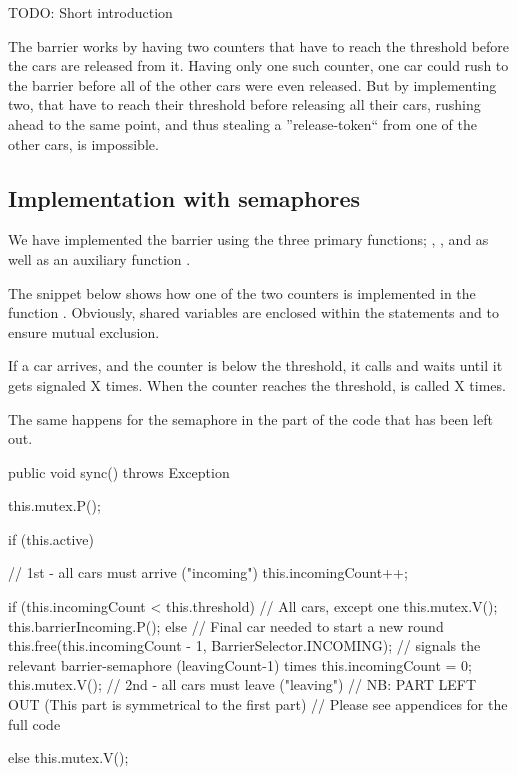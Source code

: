 
TODO: Short introduction

The barrier works by having two counters that have to reach the threshold before the cars are released from it. Having only one such counter, one car could rush to the barrier before all of the other cars were even released. But by implementing two, that have to reach their threshold before releasing all their cars, rushing ahead to the same point, and thus stealing a ''release-token`` from one of the other cars, is impossible.


\subsection{Implementation with semaphores}
\label{sub:bar-sema}
We have implemented the barrier using the three primary functions; , , and  as well as an auxiliary function .

The snippet below shows how one of the two counters is implemented in the function . Obviously, shared variables are enclosed within the statements  and  to ensure mutual exclusion.

If a car arrives, and the counter is below the threshold, it calls  and waits until it gets signaled X times. When the counter reaches the threshold,  is called X times.

The same happens for the semaphore  in the part of the code that has been left out.

\begin{java}
public void sync() throws Exception {
	this.mutex.P();

	if (this.active) {
		// 1st - all cars must arrive ("incoming")
		this.incomingCount++;

		if (this.incomingCount < this.threshold) { // All cars, except one
			this.mutex.V();
			this.barrierIncoming.P();
		} else { // Final car needed to start a new round
			this.free(this.incomingCount - 1, BarrierSelector.INCOMING);
			// signals the relevant barrier-semaphore (leavingCount-1) times
			this.incomingCount = 0;
			this.mutex.V();
		}
		// 2nd - all cars must leave ("leaving")
		// NB: PART LEFT OUT (This part is symmetrical to the first part)
		// Please see appendices for the full code
	} else 
		this.mutex.V();
}
\end{java}


